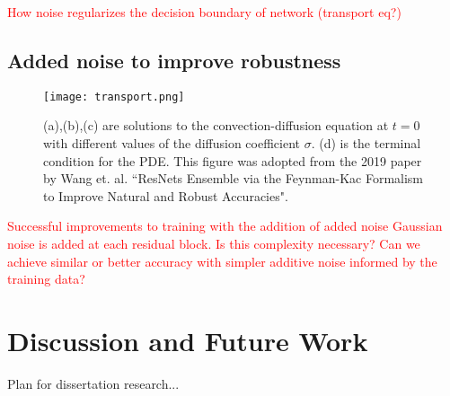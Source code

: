 \documentclass[12pt]{article}
\begin{document}
\textcolor{red}{How noise regularizes the decision boundary of network (transport eq?)}
\subsection{Added noise to improve robustness}
\begin{figure}
  \centering
  \texttt{[image: transport.png]}
  \caption{(a),(b),(c) are solutions to the convection-diffusion equation at $t=0$ with different values of the diffusion coefficient $\sigma$. (d) is the terminal condition for the PDE. This figure was adopted from the 2019 paper by Wang et. al. ``ResNets Ensemble via the Feynman-Kac Formalism to Improve Natural and Robust Accuracies"\cite{res}.}
  \label{fig:transport}
\end{figure}
\textcolor{red}{Successful improvements to training with the addition of added noise}
\textcolor{red}{Gaussian noise is added at each residual block. Is this complexity necessary? Can we achieve similar or better accuracy with simpler additive noise informed by the training data? }
\section{Discussion and Future Work}
Plan for dissertation research...

\pagebreak
\printbibliography
\end{document}
